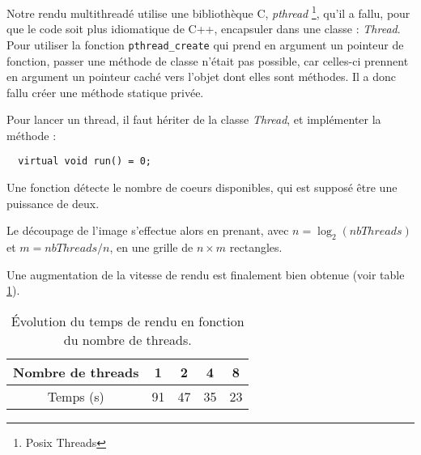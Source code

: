   Notre rendu multithreadé utilise une bibliothèque C, \emph{pthread} \footnote{Posix Threads}, qu'il a fallu, pour que le code soit plus idiomatique de C++, 
  encapsuler dans une classe : \emph{Thread}. Pour utiliser la fonction \verb|pthread_create| qui prend en argument un pointeur de fonction, passer une méthode de classe
  n'était pas possible, car celles-ci prennent en argument un pointeur caché vers l'objet dont elles sont méthodes. Il a donc fallu créer une méthode statique privée.
  
  Pour lancer un thread, il faut hériter de la classe \emph{Thread}, et implémenter la méthode :
  \begin{lstlisting}
  virtual void run() = 0;
  \end{lstlisting}
  
  Une fonction détecte le nombre de coeurs disponibles, qui est supposé être une puissance de deux.
  
  Le découpage de l'image s'effectue alors en prenant, avec $ n = \log_2(nbThreads) $ et $ m = nbThreads / n$, en une grille de $n \times m$ rectangles.
  
 Une augmentation de la vitesse de rendu est finalement bien obtenue (voir table \ref{tempsRendu}).
  
 \begin{table}
   \begin{tabular}{|c|c|c|c|c|}
  \hline 
  Nombre de threads & 1 & 2 & 4 & 8 \\ 
  \hline 
  Temps (s) & 91 & 47 & 35 & 23 \\ 
  \hline 
  \end{tabular}
  \caption{Évolution du temps de rendu en fonction du nombre de threads.} \label{tempsRendu}
\end{table}  
 